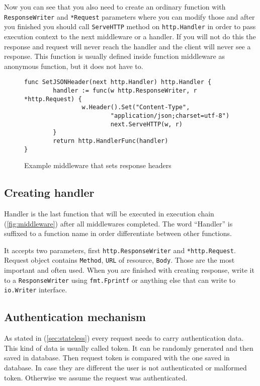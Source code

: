Now you can see that you also need to create an ordinary function with\\ \verb|ResponseWriter| and \verb|*Request| parameters where you can modify those and after you finished you should call \verb|ServeHTTP| method on \verb|http.Handler| in order to pass execution context to the next middleware or a handler. If you will not do this the response and request will never reach the handler and the client will never see a response. This function is usually defined inside function middleware as anonymous function, but it does not have to.

\begin{figure}[!htbp]
\begin{verbatim}
func SetJSONHeader(next http.Handler) http.Handler {
        handler := func(w http.ResponseWriter, r *http.Request) {
                w.Header().Set("Content-Type",
                        "application/json;charset=utf-8")
                        next.ServeHTTP(w, r)
        }
        return http.HandlerFunc(handler)
}
\end{verbatim}
\renewcommand\figurename{Code}
\caption{Example middleware that sets response headers}
\label{src:example-middleware}
\end{figure}

\subsection{Creating handler}
Handler is the last function that will be executed in execution chain (\ref{fig:middleware}) after all middlewares completed. The word ``Handler'' is suffixed to a function name in order differentiate between other functions.

It accepts two parameters, first \verb|http.ResponseWriter| and \verb|*http.Request|. Request object contains \verb|Method|, \verb|URL| of resource, \verb|Body|. Those are the most important and often used. When you are finished with creating response, write it to a \verb|ResponseWriter| using \verb|fmt.Fprintf| or anything else that can write to \verb|io.Writer| interface.

\subsection{Authentication mechanism}
As stated in (\ref{sec:stateless}) every request needs to carry authentication data. This kind of data is usually called token. It can be randomly generated and then saved in database. Then request token is compared with the one saved in database. In case they are different the user is not authenticated or malformed token. Otherwise we assume the request was authenticated.

